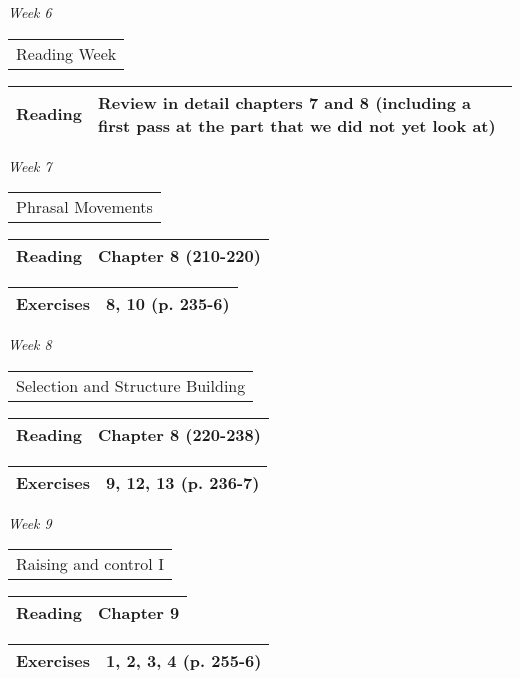 \documentclass[12pt]{article}
\begin{document}
\textit{Week 6} \dotfill \begin{tabular}[t]{l} Reading Week \end{tabular}
\begin{flushright}
\begin{tabular}[t]{|l|p{2in}|}\hline \textbf{Reading} & Review in detail chapters 7 and 8 (including a first pass at the part that we did not yet look at) \\\hline \end{tabular}
\end{flushright}
\textit{Week 7} \dotfill \begin{tabular}[t]{l} Phrasal Movements \end{tabular}
\begin{flushright}
\begin{tabular}[t]{|l|p{2in}|}\hline \textbf{Reading} & Chapter 8 (210-220) \\ \hline \end{tabular}

\begin{tabular}[t]{|l|p{4in}|}\hline \textbf{Exercises} & 8, 10 (p. 235-6) \\ \hline
\end{tabular}


\end{flushright}
\textit{Week 8} \dotfill \begin{tabular}[t]{l} Selection and Structure Building \end{tabular}
\begin{flushright}
\begin{tabular}[t]{|l|p{2in}|}\hline \textbf{Reading} & Chapter 8 (220-238) \\\hline \end{tabular}

\begin{tabular}[t]{|l|p{4in}|}\hline \textbf{Exercises} & 9, 12, 13 (p. 236-7) \\ \hline
\end{tabular}

\end{flushright}
\textit{Week 9} \dotfill \begin{tabular}[t]{l}  Raising and control I\\ \end{tabular}
\begin{flushright}
\begin{tabular}[t]{|l|p{2in}|}\hline \textbf{Reading} & Chapter 9 \\\hline \end{tabular}

\begin{tabular}[t]{|l|p{4in}|}\hline \textbf{Exercises} & 1, 2, 3, 4 (p. 255-6) \\ \hline
\end{tabular}


\end{flushright}
\end{document}
